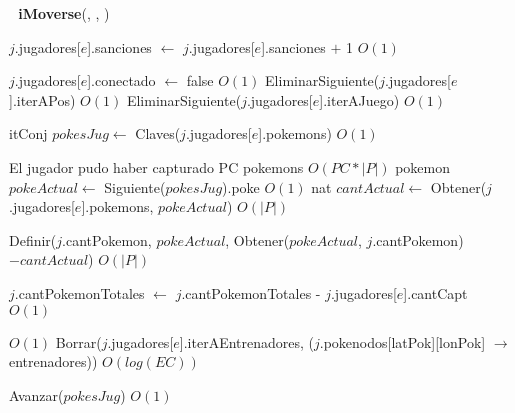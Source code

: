 \begin{Algoritmos}
\begin{algorithm}[H]
\begin{algorithmic}[1]
\end{algorithmic}
\end{algorithm}


$ $\newline
$ $\newline
{\textbf{iMoverse}(, , )}
\begin{algorithmic}[1]

  
  \State $j$.jugadores[$e$].sanciones $\gets$ $j$.jugadores[$e$].sanciones $+$ 1 \Comment $O(1)$
  
  
    \State $j$.jugadores[$e$].conectado $\gets$ false \Comment $O(1)$
    \State EliminarSiguiente($j$.jugadores[$e$].iterAPos) \Comment $O(1)$
    \State EliminarSiguiente($j$.jugadores[$e$].iterAJuego) \Comment $O(1)$
  
    \State itConj $pokesJug \gets$ Claves($j$.jugadores[$e$].pokemons) \Comment $O(1)$  
    
       \Comment El jugador pudo haber capturado PC pokemons $O(PC*|P|)$
      \State pokemon $pokeActual \gets$ Siguiente($pokesJug$).poke  \Comment $O(1)$
      \State nat $cantActual \gets$ Obtener($j$.jugadores[$e$].pokemons, $pokeActual$) \Comment $O(|P|)$
      
      \State Definir($j$.cantPokemon, $pokeActual$, Obtener($pokeActual$, $j$.cantPokemon)$-cantActual$) \Comment $O(|P|)$
    \EndWhile
    
    \State $j$.cantPokemonTotales $\gets$ $j$.cantPokemonTotales - $j$.jugadores[$e$].cantCapt \Comment $O(1)$
    
       \Comment $O(1)$
      \State Borrar($j$.jugadores[$e$].iterAEntrenadores, ($j$.pokenodos[latPok][lonPok] $\rightarrow$ entrenadores)) \Comment $O(log(EC))$
    \EndIf
    
    \State Avanzar($pokesJug$) \Comment $O(1)$

  \EndIf

\EndIf


  

\end{algorithmic}
\end{Algoritmos}

